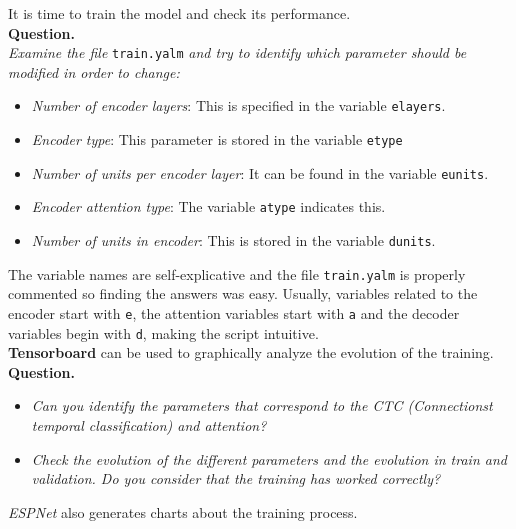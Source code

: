 \documentclass[a4paper]{article}
\def\inline{\lstinline[basicstyle=\ttfamily,keywordstyle={}]}
\begin{document}
It is time to train the model and check its performance.\\

\textbf{Question.}\\

\emph{Examine the file} \inline{train.yalm} \emph{and try to identify which parameter should be modified in order to change:}
\begin{itemize}
  \item \emph{Number of encoder layers}: This is specified in the variable \inline{elayers}.
  \item \emph{Encoder type}: This parameter is stored in the variable \inline{etype}
  \item \emph{Number of units per encoder layer}: It can be found in the variable \inline{eunits}.
  \item \emph{Encoder attention type}: The variable \inline{atype} indicates this.
  \item \emph{Number of units in encoder}: This is stored in the variable \inline{dunits}.

\end{itemize}
The variable names are self-explicative and the file \inline{train.yalm} is properly commented so finding the answers was easy. Usually, variables related to the encoder start with \inline{e}, the attention variables start with \inline{a} and the decoder variables begin with \inline{d}, making the script intuitive.\\

\textbf{Tensorboard} can be used to graphically analyze the evolution of the training.\\

\textbf{Question.}
\begin{itemize}
  \item \emph{Can you identify the parameters that correspond to the CTC (Connectionst temporal classification) and attention?}
  \item \emph{Check the evolution of the different parameters and the evolution in train and validation. Do you consider that the training has worked correctly? }
\end{itemize}

\emph{ESPNet} also generates charts about the training process.\\
\end{document}
